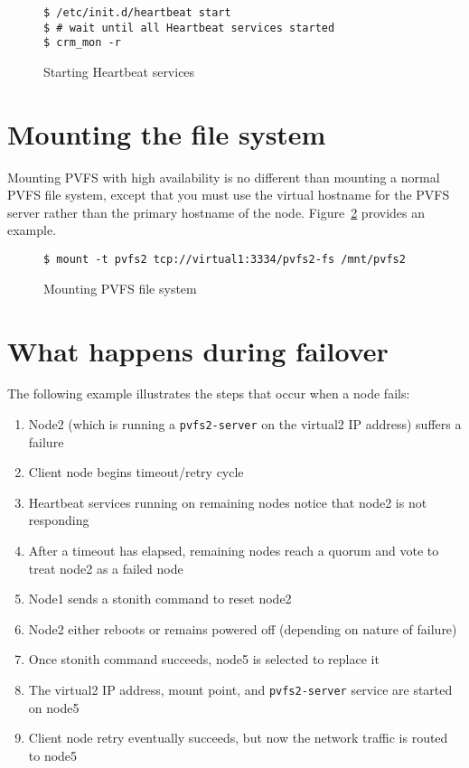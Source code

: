 \documentclass[11pt]{article}
\begin{document}
\begin{figure}
\begin{scriptsize}
\begin{verbatim}
$ /etc/init.d/heartbeat start
$ # wait until all Heartbeat services started
$ crm_mon -r
\end{verbatim}
\end{scriptsize}
\caption{Starting Heartbeat services}
\label{fig:start}
\end{figure}

\section{Mounting the file system}

Mounting PVFS with high availability is no different than mounting a
normal PVFS file system, except that you must use the virtual hostname
for the PVFS server rather than the primary hostname of the node.
Figure~\ref{fig:mount} provides an example.

\begin{figure}
\begin{scriptsize}
\begin{verbatim}
$ mount -t pvfs2 tcp://virtual1:3334/pvfs2-fs /mnt/pvfs2
\end{verbatim}
\end{scriptsize}
\caption{Mounting PVFS file system}
\label{fig:mount}
\end{figure}

\section{What happens during failover}

The following example illustrates the steps that occur when a node fails:

\begin{enumerate}
\item Node2 (which is running a \texttt{pvfs2-server} on the virtual2 IP
address) suffers a failure
\item Client node begins timeout/retry cycle
\item Heartbeat services running on remaining nodes notice that node2
is not responding
\item After a timeout has elapsed, remaining nodes reach a quorum and
vote to treat node2 as a failed node
\item Node1 sends a stonith command to reset node2
\item Node2 either reboots or remains powered off (depending on nature
of failure)
\item Once stonith command succeeds, node5 is selected to replace it
\item The virtual2 IP address, mount point, and
\texttt{pvfs2-server} service
are started on node5
\item Client node retry eventually succeeds, but now the network
traffic is routed to node5
\end{enumerate}
\end{document}
